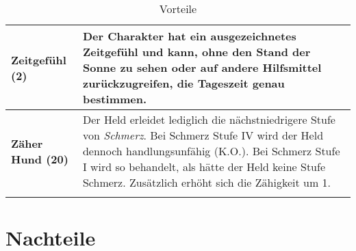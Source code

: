 \begin{longtable}{|p{5cm}|p{11cm}|}
\textbf{Zeitgefühl (2)} & Der Charakter hat ein ausgezeichnetes Zeitgefühl und kann, ohne den Stand der Sonne zu sehen oder auf andere Hilfsmittel zurückzugreifen, die Tageszeit genau bestimmen. \\ \hline

\textbf{Zäher Hund (20)} & Der Held erleidet lediglich die nächstniedrigere Stufe von \textit{Schmerz}. Bei Schmerz Stufe IV wird der Held dennoch handlungsunfähig (K.O.). Bei Schmerz Stufe I wird so behandelt, als hätte der Held keine Stufe Schmerz. Zusätzlich erhöht sich die Zähigkeit um 1. \\ \hline

\caption{Vorteile}
\label{tab:Vorteile}
\end{longtable}

\section{Nachteile}
\label{chap:nachteile}
